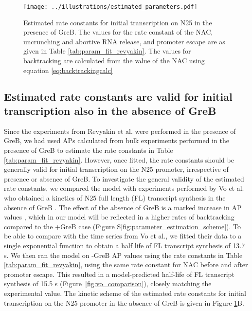 \begin{figure}
	\begin{center}
      \texttt{[image: ../illustrations/estimated\_parameters.pdf]}
	\end{center}
    \caption{Estimated rate constants for initial transcription on N25 in the
      presence of GreB. The values for the rate constant of the NAC,
      uncrunching and abortive RNA release, and promoter escape are as given
      in Table \ref{tab:param_fit_revyakin}. The values for backtracking are
      calculated from the value of the NAC using equation \eqref{eq:backtrackingcalc}}
    \label{fig:estimated_parameters}
\end{figure}

\subsection{Estimated rate constants are valid for initial transcription also
in the absence of GreB}
Since the experiments from Revyakin et al. were performed in the presence of
GreB, we had used APs calculated from bulk experiments performed in the presence of
GreB to estimate the rate constants in Table \ref{tab:param_fit_revyakin}.
However, once fitted, the rate constants should be generally valid for initial
transcription on the N25 promoter, irrespective of presence or absence of
GreB. To investigate the general validity of the estimated rate constants, we
compared the model with experiments performed by Vo et al.  who obtained a
kinetics of N25 full length (FL) transcript synthesis in the absence of GreB
\cite{vo_vitro_2003-1}. The effect of the absence of GreB is a marked increase
in AP values \cite{hsu_initial_2006}, which in our model will be reflected in
a higher rates of backtracking compared to the +GreB case (Figure
S\ref{fig:parameter_estimation_scheme}). To be able to compare with the time
series from Vo et al., we fitted their data to a single exponential function
to obtain a half life of FL transcript synthesis of 13.7 s. We then ran the
model on -GreB AP values using the rate constants in Table
\ref{tab:param_fit_revyakin}, using the same rate constant for NAC before and
after promoter escape. This resulted in a model-predicted half-life of FL
transcript synthesis of 15.5 s (Figure~\ref{fig:vo_comparison}), closely
matching the experimental value. The kinetic scheme of the estimated rate
constants for initial transcription on the N25 promoter in the absence of GreB
is given in Figure \ref{fig:estimated_parameters}B.

